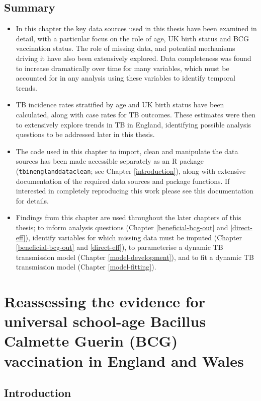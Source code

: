 \documentclass[11pt,twoside]{bristolthesis}
\begin{document}
  \hypertarget{summary-3}{%
  \section{Summary}\label{summary-3}}
  \begin{itemize}
  \item
    In this chapter the key data sources used in this thesis have been examined in detail, with a particular focus on the role of age, UK birth status and BCG vaccination status. The role of missing data, and potential mechanisms driving it have also been extensively explored. Data completeness was found to increase dramatically over time for many variables, which must be accounted for in any analysis using these variables to identify temporal trends.
  \item
    TB incidence rates stratified by age and UK birth status have been calculated, along with case rates for TB outcomes. These estimates were then to extensively explore trends in TB in England, identifying possible analysis questions to be addressed later in this thesis.
  \item
    The code used in this chapter to import, clean and manipulate the data sources has been made accessible separately as an R package (\texttt{tbinenglanddataclean}; see Chapter \ref{introduction}), along with extensive documentation of the required data sources and package functions. If interested in completely reproducing this work please see this documentation for details.
  \item
    Findings from this chapter are used throughout the later chapters of this thesis; to inform analysis questions (Chapter \ref{beneficial-bcg-out} and \ref{direct-eff}), identify variables for which missing data must be imputed (Chapter \ref{beneficial-bcg-out} and \ref{direct-eff}), to parameterise a dynamic TB transmission model (Chapter \ref{model-development}), and to fit a dynamic TB transmission model (Chapter \ref{model-fitting}).
  \end{itemize}
  \hypertarget{sutherland}{%
  \chapter{Reassessing the evidence for universal school-age Bacillus Calmette Guerin (BCG) vaccination in England and Wales}\label{sutherland}}
  
  \hypertarget{introduction-3}{%
  \section{Introduction}\label{introduction-3}}
  
\end{document}
